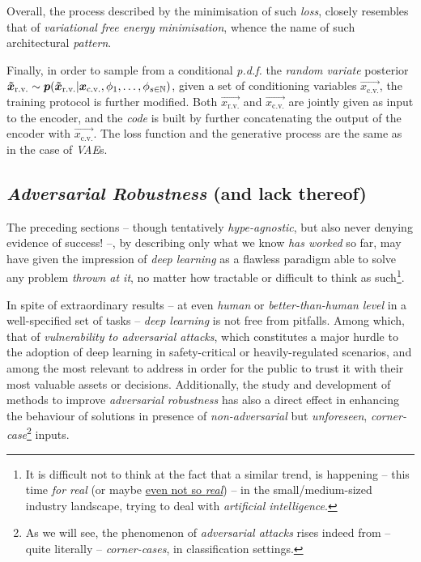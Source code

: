 Overall, the process described by the minimisation of such \textit{loss}, closely resembles that of \textit{variational free energy minimisation}, whence the name of such architectural \textit{pattern}.

Finally, in order to sample from a conditional \textit{p.d.f.} the \textit{random variate} posterior\linebreak
${\bm{\tilde{x}_{\text{r.v.}}} \sim \bm{p}(\bm{\tilde{x}_{\text{r.v.}}} | \bm{{x}_{\text{c.v.}}}, \phi_1, \dots, \phi_{s\in\mathbb{N}})}$, given a set of conditioning variables $\vec{{x}_{\text{c.v.}}}$, the training protocol is further modified. Both $\vec{{x}_{\text{r.v.}}}$ and $\vec{{x}_{\text{c.v.}}}$ are jointly given as input to the encoder, and the \textit{code} is built by further concatenating the output of the encoder with $\vec{{x}_{\text{c.v.}}}$. The loss function and the generative process are the same as in the case of \textit{VAE}s.

\subsection{\textit{Adversarial Robustness} (and lack thereof)}

The preceding sections -- though tentatively \textit{hype-agnostic}, but also never denying evidence of success! --, by describing only what we know \textit{has worked} so far, may have given the impression of \textit{deep learning} as a flawless paradigm able to solve any problem \textit{thrown at it}, no matter how tractable or difficult to think as such\footnote{It is difficult not to think at the fact that a similar trend, is happening -- this time \textit{for real} (or maybe \href{https://cutt.ly/europe_ai_startup_not_ai}{even not so \textit{real}}) -- in the small/medium-sized industry landscape, trying to deal with \textit{artificial intelligence}.}.

In spite of extraordinary results -- at even \textit{human} or \textit{better-than-human} \textit{level} in a well-specified set of tasks -- \textit{deep learning} is not free from pitfalls. Among which, that of \textit{vulnerability to adversarial attacks}, which constitutes a major hurdle to the adoption of deep learning in safety-critical or heavily-regulated scenarios, and among the most relevant to address in order for the public to trust it with their most valuable assets or decisions. Additionally, the study and development of methods to improve \textit{adversarial robustness} has also a direct effect in enhancing the behaviour of solutions in presence of \textit{non-adversarial} but \textit{unforeseen}, \textit{corner-case}\footnote{As we will see, the phenomenon of \textit{adversarial attacks} rises indeed from -- quite literally -- \textit{corner-cases}, in classification settings.} inputs.

